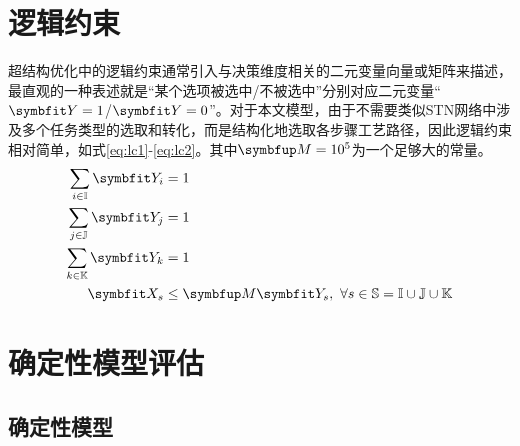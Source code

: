\section{逻辑约束}

超结构优化中的逻辑约束通常引入与决策维度相关的二元变量向量或矩阵来描述，最直观的一种表述就是“某个选项被选中/不被选中”分别对应二元变量“$\symbfit Y=1$/$\symbfit Y=0$”。对于本文模型，由于不需要类似STN网络中涉及多个任务类型的选取和转化，而是结构化地选取各步骤工艺路径，因此逻辑约束相对简单，如式\eqref{eq:lc1}-\eqref{eq:lc2}。其中$\symbfup M=10^5$为一个足够大的常量。
\begin{align}
  \sum_{i\in\mathbb I}\symbfit Y_i&=1 \label{eq:lc1} \\
  \sum_{j\in\mathbb J}\symbfit Y_j&=1 \\ 
  \sum_{k\in\mathbb K}\symbfit Y_k&=1 \\
  \symbfit X_s &\le \symbfup M\symbfit Y_s,\ \forall s\in \mathbb S = \mathbb I \cup\mathbb J\cup\mathbb K \label{eq:lc2} 
\end{align}

\section{确定性模型评估}
\subsection{确定性模型}

